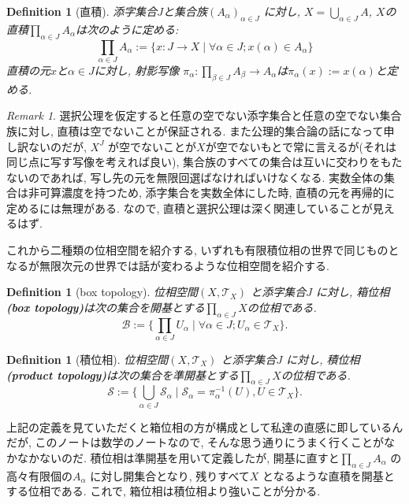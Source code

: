 \documentclass[dvipdfmx]{jbook}
\newtheorem{definition}[theorem]{Definition}
\theoremstyle{remark}
\newtheorem{remark}[theorem]{Remark}
\theoremstyle{plain}
\begin{document}
\begin{definition}[直積]
	添字集合$J$と集合族$\left( A_{\alpha} \right) _{\alpha \in J}$ に対し,  $X=\bigcup_{\alpha \in J} A$, $X$の直積$\prod_{\alpha \in J}A_{\alpha}$は次のように定める:
	 \[
	\prod_{\alpha \in J}A_{\alpha} :=\{x:J\to X \mid \forall \alpha \in J; x(\alpha) \in A_{\alpha} \} 
	\] 
	直積の元$x$と$\alpha \in J$に対し, 射影写像 $\pi_{\alpha} : \prod_{\beta \in J}A_{\beta} \to A_{\alpha}$は$\pi_{\alpha}(x):= x(\alpha)$と定める.
\end{definition}

\begin{remark}
選択公理を仮定すると任意の空でない添字集合と任意の空でない集合族に対し, 直積は空でないことが保証される. また公理的集合論の話になって申し訳ないのだが, $X^J$ が空でないことが$X$が空でないもとで常に言えるが(それは同じ点に写す写像を考えれば良い), 集合族のすべての集合は互いに交わりをもたないのであれば, 写し先の元を無限回選ばなければいけなくなる. 実数全体の集合は非可算濃度を持つため, 添字集合を実数全体にした時, 直積の元を再帰的に定めるには無理がある. なので, 直積と選択公理は深く関連していることが見えるはず.
\end{remark}

これから二種類の位相空間を紹介する, いずれも有限積位相の世界で同じものとなるが無限次元の世界では話が変わるような位相空間を紹介する.

\begin{definition}[box topology]
	位相空間$\left( X,\mathcal{T}_X \right) $ と添字集合$J$ に対し, 箱位相 \textbf{(box topology)}は次の集合を開基とする$\prod_{\alpha \in J}X$の位相である. 
	 \[
	\mathcal{B}:=\{\prod_{\alpha \in J}U_{\alpha}  \mid \forall \alpha \in J; U_{\alpha} \in \mathcal{T}_X\} 
	.\] 
\end{definition}

\begin{definition}[積位相]
	位相空間$\left( X,\mathcal{T}_X \right) $ と添字集合$J$ に対し, 積位相 \textbf{(product topology)}は次の集合を準開基とする$\prod_{\alpha \in J}X$の位相である. 
	\[
	\mathcal{S}:=\{\bigcup_{\alpha \in J}\mathcal{S}_{\alpha} \mid \mathcal{S}_{\alpha}= \pi_{\alpha}^{-1} \left( U \right)  , U \in \mathcal{T}_X \} 
	.\] 
\end{definition}

上記の定義を見ていただくと箱位相の方が構成として私達の直感に即しているんだが, このノートは数学のノートなので, そんな思う通りにうまく行くことがなかなかないのだ.
積位相は準開基を用いて定義したが, 開基に直すと$\prod_{\alpha \in J} A_{\alpha}  $ の高々有限個の$A_{\alpha}$ に対し開集合となり, 残りすべて$X$ となるような直積を開基とする位相である. 
これで, 箱位相は積位相より強いことが分かる. 
\end{document}
